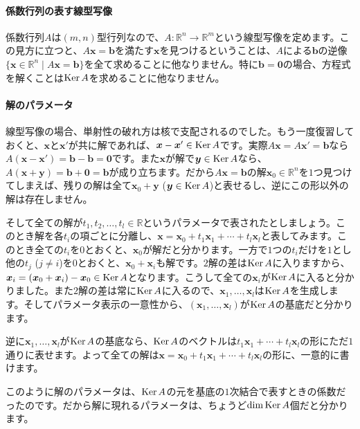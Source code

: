 \paragraph{係数行列の表す線型写像}

係数行列$A$は$(m, n)$型行列なので、$A\colon \mathbb{R}^n \rightarrow \mathbb{R}^m$という線型写像を定めます。この見方に立つと、$A\bm{x} = \bm{b}$を満たす$\bm{x}$を見つけるということは、$A$による$\bm{b}$の逆像$\{\bm{x} \in \mathbb{R}^n\mid A\bm{x} = \bm{b}\}$を全て求めることに他なりません。特に$\bm{b} = \bm{0}$の場合、方程式を解くことは$\operatorname{Ker} A$を求めることに他なりません。

\paragraph{解のパラメータ}

線型写像の場合、単射性の破れ方は核で支配されるのでした。もう一度復習しておくと、$\bm{x}$と$\bm{x}'$が共に解であれば、$\boldsymbol{x} - \boldsymbol{x}' \in \operatorname{Ker} A$です。実際$A\bm{x} = A\bm{x}' = \bm{b}$なら$A(\bm{x} - \bm{x}') = \bm{b} - \bm{b} = \bm{0}$です。また$\bm{x}$が解で$\boldsymbol{y} \in \operatorname{Ker} A$なら、$A(\bm{x} + \bm{y}) = \bm{b} + \bm{0} = \bm{b}$が成り立ちます。だから$A\bm{x} = \bm{b}$の解$\bm{x}_0 \in \mathbb{R}^n$を$1$つ見つけてしまえば、残りの解は全て$\bm{x}_0 + \bm{y}$ ($\boldsymbol{y} \in \operatorname{Ker} A$)と表せるし、逆にこの形以外の解は存在しません。

そして全ての解が$t_1, t_2, \ldots, t_l \in \mathbb{R}$というパラメータで表されたとしましょう。このとき解を各$t_i$の項ごとに分離し、$\bm{x} = \bm{x}_0 + t_1\bm{x}_1 + \cdots + t_l \bm{x}_l$と表してみます。このとき全ての$t_i$を$0$とおくと、$\bm{x}_0$が解だと分かります。一方で$1$つの$t_i$だけを$1$とし他の$t_j$ ($j \neq i$)を$0$とおくと、$\bm{x}_0 + \bm{x}_i$も解です。$2$解の差は$\operatorname{Ker} A$に入りますから、$\boldsymbol{x}_i = (\boldsymbol{x}_0 + \boldsymbol{x}_i) - \boldsymbol{x}_0 \in \operatorname{Ker} A$となります。こうして全ての$\bm{x}_i$が$\operatorname{Ker} A$に入ると分かりました。また$2$解の差は常に$\operatorname{Ker} A$に入るので、$\bm{x}_1, \ldots, \bm{x}_l$は$\operatorname{Ker} A$を生成します。そしてパラメータ表示の一意性から、$(\bm{x}_1, \ldots, \bm{x}_l)$が$\operatorname{Ker} A$の基底だと分かります。

逆に$\bm{x}_1, \ldots, \bm{x}_l$が$\operatorname{Ker} A$の基底なら、$\operatorname{Ker} A$のベクトルは$t_1\bm{x}_1 + \cdots + t_l \bm{x}_l$の形にただ$1$通りに表せます。よって全ての解は$\bm{x} = \bm{x}_0 + t_1\bm{x}_1 + \cdots + t_l \bm{x}_l$の形に、一意的に書けます。

このように解のパラメータは、$\operatorname{Ker} A$の元を基底の$1$次結合で表すときの係数だったのです。だから解に現れるパラメータは、ちょうど$\dim \operatorname{Ker} A$個だと分かります。

